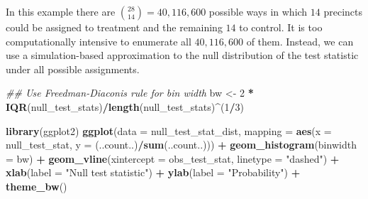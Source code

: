 \documentclass[
  12pt,
  leqno]{article}
\newenvironment{Shaded}{\begin{snugshade}}{\end{snugshade}}
\newcommand{\CommentTok}[1]{\textcolor[rgb]{0.56,0.35,0.01}{\textit{#1}}}
\newcommand{\DataTypeTok}[1]{\textcolor[rgb]{0.13,0.29,0.53}{#1}}
\newcommand{\DecValTok}[1]{\textcolor[rgb]{0.00,0.00,0.81}{#1}}
\newcommand{\KeywordTok}[1]{\textcolor[rgb]{0.13,0.29,0.53}{\textbf{#1}}}
\newcommand{\NormalTok}[1]{#1}
\newcommand{\OperatorTok}[1]{\textcolor[rgb]{0.81,0.36,0.00}{\textbf{#1}}}
\newcommand{\StringTok}[1]{\textcolor[rgb]{0.31,0.60,0.02}{#1}}
\DeclareMathOperator{\1}{\mathbbm{1}}
\begin{document}
\normalsize

In this example there are \(\binom{28}{14} = 40,116,600\) possible ways
in which \(14\) precincts could be assigned to treatment and the
remaining \(14\) to control. It is too computationally intensive to
enumerate all \(40,116,600\) of them. Instead, we can use a
simulation-based approximation to the null distribution of the test
statistic under all possible assignments.

\scriptsize

\begin{Shaded}
\end{Shaded}

\normalsize

\scriptsize

\begin{Shaded}
\begin{Highlighting}[]
\CommentTok{\#\# Use Freedman{-}Diaconis rule for bin width}
\NormalTok{bw \textless{}{-}}\StringTok{ }\DecValTok{2} \OperatorTok{*}\StringTok{ }\KeywordTok{IQR}\NormalTok{(null\_test\_stats)}\OperatorTok{/}\KeywordTok{length}\NormalTok{(null\_test\_stats)}\OperatorTok{\^{}}\NormalTok{(}\DecValTok{1}\OperatorTok{/}\DecValTok{3}\NormalTok{)}

\KeywordTok{library}\NormalTok{(ggplot2)}
\KeywordTok{ggplot}\NormalTok{(}\DataTypeTok{data =}\NormalTok{ null\_test\_stat\_dist, }\DataTypeTok{mapping =} \KeywordTok{aes}\NormalTok{(}\DataTypeTok{x =}\NormalTok{ null\_test\_stat, }\DataTypeTok{y =}\NormalTok{ (..count..)}\OperatorTok{/}\KeywordTok{sum}\NormalTok{(..count..))) }\OperatorTok{+}\StringTok{ }
\StringTok{    }\KeywordTok{geom\_histogram}\NormalTok{(}\DataTypeTok{binwidth =}\NormalTok{ bw) }\OperatorTok{+}\StringTok{ }\KeywordTok{geom\_vline}\NormalTok{(}\DataTypeTok{xintercept =}\NormalTok{ obs\_test\_stat, }\DataTypeTok{linetype =} \StringTok{"dashed"}\NormalTok{) }\OperatorTok{+}\StringTok{ }
\StringTok{    }\KeywordTok{xlab}\NormalTok{(}\DataTypeTok{label =} \StringTok{"Null test statistic"}\NormalTok{) }\OperatorTok{+}\StringTok{ }\KeywordTok{ylab}\NormalTok{(}\DataTypeTok{label =} \StringTok{"Probability"}\NormalTok{) }\OperatorTok{+}\StringTok{ }\KeywordTok{theme\_bw}\NormalTok{()}
\end{Highlighting}
\end{Shaded}
\end{document}
